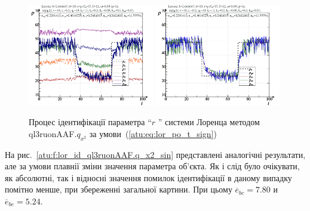 \begin{figure}[ht!]
  \centerline{
    \includegraphics[width=0.49\textwidth]{p/cha/lor/ql3ruonAAF/lor_ql3ruonAAF_qy2-p_t_pi_sign.png}
    \hfill
    \includegraphics[width=0.49\textwidth]{p/cha/lor/ql3ruonAAF/lor_ql3ruonAAF_qy2-p_t_pz_sign.png}
  }
\caption{Процес ідентифікації параметра ``$r$ '' системи Лоренца методом ql3ruonAAF.$q_{x^2} $ за умови~(\ref{atu:eq:lor_po_t_sign})}
  \label{atu:f:lor_id_ql3ruonAAF.q_x2_sign}
\end{figure}


На рис.~\ref{atu:f:lor_id_ql3ruonAAF.q_x2_sin} представлені аналогічні результати,
але за умови плавнії зміни значення параметра об'єкта. Як і слід
було очікувати, як абсолютні, так і відносні значення помилок
ідентифікації в даному випадку помітно менше, при збереженні
загальної картини. При цьому
$\overline{e}_{bc}=7.80$
и
$\overline{e}_{be}=5.24$.



